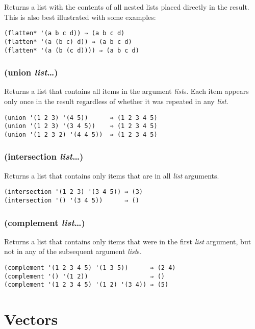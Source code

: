 \documentclass{article}
\begin{document}
Returns a list with the contents of all nested lists placed directly in the result. This is
also best illustrated with some examples:

\begin{verbatim}
(flatten* '(a b c d)) ⇒ (a b c d)
(flatten* '(a (b c) d)) ⇒ (a b c d)
(flatten* '(a (b (c d)))) ⇒ (a b c d)
\end{verbatim}

\subsubsection{(union \emph{list}\ldots{})}

Returns a list that contains all items in the argument \emph{list}s. Each item appears only
once in the result regardless of whether it was repeated in any \emph{list}.

\begin{verbatim}
(union '(1 2 3) '(4 5))      ⇒ (1 2 3 4 5)
(union '(1 2 3) '(3 4 5))    ⇒ (1 2 3 4 5)
(union '(1 2 3 2) '(4 4 5))  ⇒ (1 2 3 4 5)
\end{verbatim}

\subsubsection{(intersection \emph{list}\ldots{})}

Returns a list that contains only items that are in all \emph{list} arguments.

\begin{verbatim}
(intersection '(1 2 3) '(3 4 5)) ⇒ (3)
(intersection '() '(3 4 5))      ⇒ ()
\end{verbatim}

\subsubsection{(complement \emph{list}\ldots{})}

Returns a list that contains only items that were in the first \emph{list} argument, but not
in any of the subsequent argument \emph{list}s.

\begin{verbatim}
(complement '(1 2 3 4 5) '(1 3 5))      ⇒ (2 4)
(complement '() '(1 2))                 ⇒ ()
(complement '(1 2 3 4 5) '(1 2) '(3 4)) ⇒ (5)
\end{verbatim}

\section{Vectors}\label{sec:vectors}
\end{document}
